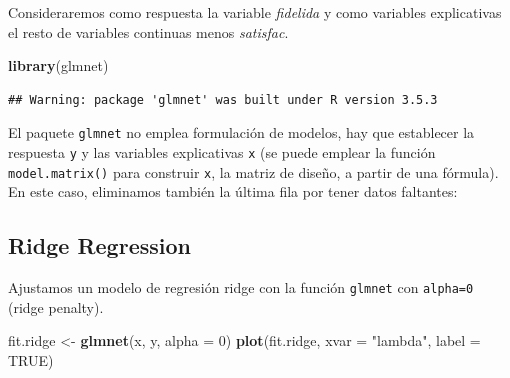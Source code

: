 \documentclass[]{book}
\newenvironment{Shaded}{\begin{snugshade}}{\end{snugshade}}
\newcommand{\KeywordTok}[1]{\textcolor[rgb]{0.13,0.29,0.53}{\textbf{#1}}}
\newcommand{\DataTypeTok}[1]{\textcolor[rgb]{0.13,0.29,0.53}{#1}}
\newcommand{\DecValTok}[1]{\textcolor[rgb]{0.00,0.00,0.81}{#1}}
\newcommand{\StringTok}[1]{\textcolor[rgb]{0.31,0.60,0.02}{#1}}
\newcommand{\OtherTok}[1]{\textcolor[rgb]{0.56,0.35,0.01}{#1}}
\newcommand{\OperatorTok}[1]{\textcolor[rgb]{0.81,0.36,0.00}{\textbf{#1}}}
\newcommand{\NormalTok}[1]{#1}
\begin{document}
Consideraremos como respuesta la variable \emph{fidelida} y como
variables explicativas el resto de variables continuas menos
\emph{satisfac}.

\begin{Shaded}
\begin{Highlighting}[]
\KeywordTok{library}\NormalTok{(glmnet)}
\end{Highlighting}
\end{Shaded}

\begin{verbatim}
## Warning: package 'glmnet' was built under R version 3.5.3
\end{verbatim}

El paquete \texttt{glmnet} no emplea formulación de modelos, hay que
establecer la respuesta \texttt{y} y las variables explicativas
\texttt{x} (se puede emplear la función \texttt{model.matrix()} para
construir \texttt{x}, la matriz de diseño, a partir de una fórmula). En
este caso, eliminamos también la última fila por tener datos faltantes:

\begin{Shaded}
\end{Shaded}

\subsection{Ridge Regression}\label{ridge-regression}

Ajustamos un modelo de regresión ridge con la función \texttt{glmnet}
con \texttt{alpha=0} (ridge penalty).

\begin{Shaded}
\begin{Highlighting}[]
\NormalTok{fit.ridge <-}\StringTok{ }\KeywordTok{glmnet}\NormalTok{(x, y, }\DataTypeTok{alpha =} \DecValTok{0}\NormalTok{)}
\KeywordTok{plot}\NormalTok{(fit.ridge, }\DataTypeTok{xvar =} \StringTok{"lambda"}\NormalTok{, }\DataTypeTok{label =} \OtherTok{TRUE}\NormalTok{)}
\end{Highlighting}
\end{Shaded}
\end{document}
